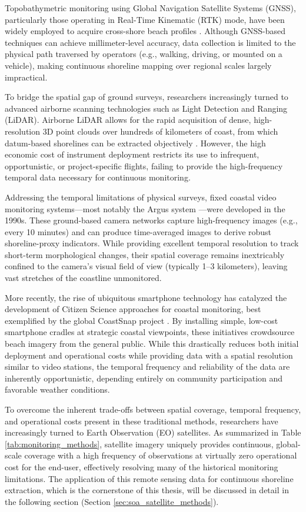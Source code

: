 ﻿\documentclass[ENG]{TFUOC}%
\begin{document}
Topobathymetric monitoring using Global Navigation Satellite Systems (GNSS), particularly those operating in Real-Time Kinematic (RTK) mode, have been widely employed to acquire cross-shore beach profiles \citep{morton_monitoring_1993}. Although GNSS-based techniques can achieve millimeter-level accuracy, data collection is limited to the physical path traversed by operators (e.g., walking, driving, or mounted on a vehicle), making continuous shoreline mapping over regional scales largely impractical.

To bridge the spatial gap of ground surveys, researchers increasingly turned to advanced airborne scanning technologies such as Light Detection and Ranging (LiDAR). Airborne LiDAR allows for the rapid acquisition of dense, high-resolution 3D point clouds over hundreds of kilometers of coast, from which datum-based shorelines can be extracted objectively \citep{stockdon_estimation_2002}. However, the high economic cost of instrument deployment restricts its use to infrequent, opportunistic, or project-specific flights, failing to provide the high-frequency temporal data necessary for continuous monitoring.

Addressing the temporal limitations of physical surveys, fixed coastal video monitoring systems—most notably the Argus system \citep{holman_application_1993}—were developed in the 1990s. These ground-based camera networks capture high-frequency images (e.g., every 10 minutes) and can produce time-averaged images to derive robust shoreline-proxy indicators. While providing excellent temporal resolution to track short-term morphological changes, their spatial coverage remains inextricably confined to the camera's visual field of view (typically 1–3 kilometers), leaving vast stretches of the coastline unmonitored.

More recently, the rise of ubiquitous smartphone technology has catalyzed the development of Citizen Science approaches for coastal monitoring, best exemplified by the global CoastSnap project \citep{harley_coastsnap_2022}. By installing simple, low-cost smartphone cradles at strategic coastal viewpoints, these initiatives crowdsource beach imagery from the general public. While this drastically reduces both initial deployment and operational costs while providing data with a spatial resolution similar to video stations, the temporal frequency and reliability of the data are inherently opportunistic, depending entirely on community participation and favorable weather conditions.

To overcome the inherent trade-offs between spatial coverage, temporal frequency, and operational costs present in these traditional methods, researchers have increasingly turned to Earth Observation (EO) satellites. As summarized in Table \ref{tab:monitoring_methods}, satellite imagery uniquely provides continuous, global-scale coverage with a high frequency of observations at virtually zero operational cost for the end-user, effectively resolving many of the historical monitoring limitations. The application of this remote sensing data for continuous shoreline extraction, which is the cornerstone of this thesis, will be discussed in detail in the following section (Section \ref{sec:soa_satellite_methods}).
\end{document}
